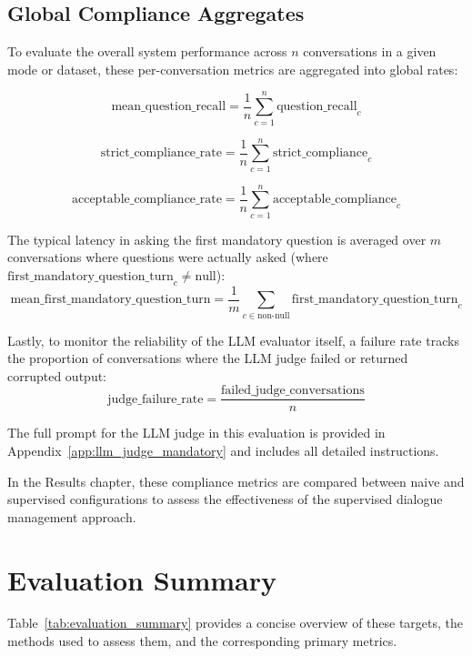 \subsection{Global Compliance Aggregates}

To evaluate the overall system performance across $n$ conversations in a given mode or dataset, these per-conversation metrics are aggregated into global rates:

\[
\text{mean\_question\_recall} = \frac{1}{n} \sum_{c=1}^{n} \text{question\_recall}_c
\]

\[
\text{strict\_compliance\_rate} = \frac{1}{n} \sum_{c=1}^{n} \text{strict\_compliance}_c
\]

\[
\text{acceptable\_compliance\_rate} = \frac{1}{n} \sum_{c=1}^{n} \text{acceptable\_compliance}_c
\]

The typical latency in asking the first mandatory question is averaged over $m$ conversations where questions were actually asked (where $\text{first\_mandatory\_question\_turn}_c \neq \text{null}$):
\[
\text{mean\_first\_mandatory\_question\_turn} = \frac{1}{m} \sum_{c\in \text{non-null}} \text{first\_mandatory\_question\_turn}_c
\]

Lastly, to monitor the reliability of the LLM evaluator itself, a failure rate tracks the proportion of conversations where the LLM judge failed or returned corrupted output:
\[
\text{judge\_failure\_rate} = \frac{\text{failed\_judge\_conversations}}{n}
\]

The full prompt for the LLM judge in this evaluation is provided in Appendix~\ref{app:llm_judge_mandatory} and includes all detailed instructions.

In the Results chapter, these compliance metrics are compared between naive and supervised configurations to assess the effectiveness of the supervised dialogue management approach.

\section{Evaluation Summary}

Table~\ref{tab:evaluation_summary} provides a concise overview of these targets, the methods used to assess them, and the corresponding primary metrics.

